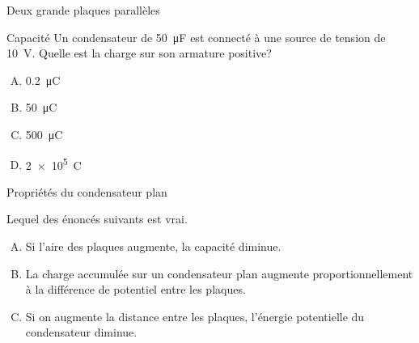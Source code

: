 \documentclass{beamer}
\begin{document}
\begin{frame}[t]{Deux grande plaques parallèles}


\end{frame}


\begin{frame}{Capacité}
  Un condensateur de \SI{50}{\micro\farad} est connecté à une source de tension
  de \SI{10}{\volt}. Quelle est la charge sur son armature positive?

  \begin{enumerate}[A.]
    \item \SI{0.2}{\micro\coulomb}
    \item \SI{50}{\micro\coulomb}
    \item<alert@2> \SI{500}{\micro\coulomb}
    \item \SI{2e5}{\coulomb}
  \end{enumerate}
\end{frame}

\begin{frame}[t]{Propriétés du condensateur plan}

Lequel des énoncés suivants est vrai.

\begin{enumerate}[A.]
  \item Si l'aire des plaques augmente, la capacité diminue.
  \item<alert@2> La charge accumulée sur un condensateur plan augmente
    proportionnellement à la différence de potentiel entre les plaques.
  \item Si on augmente la distance entre les plaques, l'énergie potentielle du
    condensateur diminue.
\end{enumerate}
\end{frame}
\end{document}
